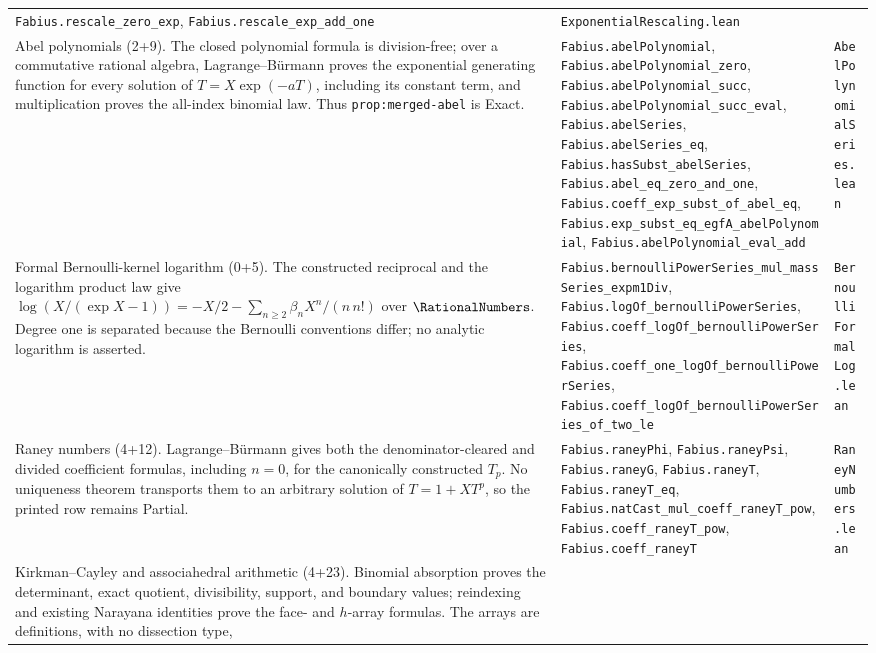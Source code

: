 \documentclass[11pt,oneside]{article}
\theoremstyle{definition}
\theoremstyle{remark}
\begin{document}
\begin{longtable}{@{}p{}p{}p{}@{}}
\nolinkurl{Fabius.rescale_zero_exp},
\nolinkurl{Fabius.rescale_exp_add_one} &
\nolinkurl{ExponentialRescaling.lean} \\
Abel polynomials (2+9).  The closed polynomial formula is division-free; over
a commutative rational algebra, Lagrange--B\"urmann proves the exponential
generating function for every solution of \(T=X\exp(-aT)\), including its
constant term, and multiplication proves the all-index binomial law.  Thus
\nolinkurl{prop:merged-abel} is Exact. &
\nolinkurl{Fabius.abelPolynomial},
\nolinkurl{Fabius.abelPolynomial_zero},
\nolinkurl{Fabius.abelPolynomial_succ},
\nolinkurl{Fabius.abelPolynomial_succ_eval},
\nolinkurl{Fabius.abelSeries},
\nolinkurl{Fabius.abelSeries_eq},
\nolinkurl{Fabius.hasSubst_abelSeries},
\nolinkurl{Fabius.abel_eq_zero_and_one},
\nolinkurl{Fabius.coeff_exp_subst_of_abel_eq},
\nolinkurl{Fabius.exp_subst_eq_egfA_abelPolynomial},
\nolinkurl{Fabius.abelPolynomial_eval_add} &
\nolinkurl{AbelPolynomialSeries.lean} \\
Formal Bernoulli-kernel logarithm (0+5).  The constructed reciprocal and the
logarithm product law give
\(\log(X/(\exp X-1))=-X/2-\sum_{n\ge2}\beta_nX^n/(n\,n!)\) over
\(\RationalNumbers\).  Degree one is separated because the Bernoulli
conventions differ; no analytic logarithm is asserted. &
\nolinkurl{Fabius.bernoulliPowerSeries_mul_massSeries_expm1Div},
\nolinkurl{Fabius.logOf_bernoulliPowerSeries},
\nolinkurl{Fabius.coeff_logOf_bernoulliPowerSeries},
\nolinkurl{Fabius.coeff_one_logOf_bernoulliPowerSeries},
\nolinkurl{Fabius.coeff_logOf_bernoulliPowerSeries_of_two_le} &
\nolinkurl{BernoulliFormalLog.lean} \\
Raney numbers (4+12).  Lagrange--B\"urmann gives both the denominator-cleared
and divided coefficient formulas, including \(n=0\), for the canonically
constructed \(T_p\).  No uniqueness theorem transports them to an arbitrary
solution of \(T=1+XT^p\), so the printed row remains Partial. &
\nolinkurl{Fabius.raneyPhi}, \nolinkurl{Fabius.raneyPsi},
\nolinkurl{Fabius.raneyG}, \nolinkurl{Fabius.raneyT},
\nolinkurl{Fabius.raneyT_eq},
\nolinkurl{Fabius.natCast_mul_coeff_raneyT_pow},
\nolinkurl{Fabius.coeff_raneyT_pow},
\nolinkurl{Fabius.coeff_raneyT} &
\nolinkurl{RaneyNumbers.lean} \\
Kirkman--Cayley and associahedral arithmetic (4+23).  Binomial absorption
proves the determinant, exact quotient, divisibility, support, and boundary
values; reindexing and existing Narayana identities prove the face- and
\(h\)-array formulas.  The arrays are definitions, with no dissection type,

\end{longtable}
\end{document}
